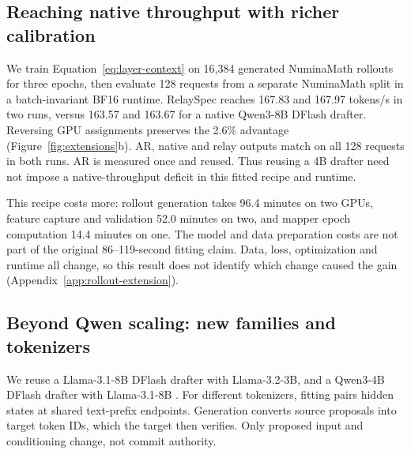 \documentclass{article}
\begin{document}
\begin{table}[H]
\caption{Public-runtime comparison on 128 MATH development questions,
2,048-token cap. Correct counts are out of 128, with each system's AR in
parentheses. Precision, attention and libraries differ, so speedups use
own-runtime AR. Bold marks the highest observed throughput and own-runtime speedup.
Settings and paired quality uncertainty appear in
Appendix~\ref{app:externalbaselines}.}
\label{tab:public-comparison}
\centering\small

\end{table}

\subsection{Reaching native throughput with richer calibration}
\label{sec:rollout-extension}

We train
Equation~\ref{eq:layer-context} on 16,384 generated NuminaMath rollouts \citep{li2024numinamath}
for three epochs, then evaluate 128 requests from a separate NuminaMath
split in a batch-invariant BF16 runtime. RelaySpec reaches 167.83 and
167.97 tokens/s in two runs, versus 163.57 and 163.67 for a native
Qwen3-8B DFlash drafter. Reversing GPU assignments preserves the 2.6\%
advantage (Figure~\ref{fig:extensions}b). AR, native and relay outputs
match on all 128 requests in both runs. AR is measured once and reused.
Thus reusing a 4B drafter need not impose a native-throughput deficit
in this fitted recipe and runtime.



This recipe costs more: rollout generation takes 96.4 minutes on two
GPUs, feature capture and validation 52.0 minutes on two, and mapper
epoch computation 14.4 minutes on one. The model and data preparation costs are not part of the
original 86--119-second fitting claim. Data, loss, optimization and
runtime all change, so this result does not identify which change caused
the gain (Appendix~\ref{app:rollout-extension}).

\subsection{Beyond Qwen scaling: new families and tokenizers}
\label{sec:family-extension}

We reuse a Llama-3.1-8B DFlash drafter with Llama-3.2-3B, and a
Qwen3-4B DFlash drafter with Llama-3.1-8B
\citep{grattafiori2024llama3,meta2024llama32}. For different tokenizers,
fitting pairs hidden states at shared text-prefix endpoints. Generation
converts source proposals into target token IDs, which the target then
verifies. Only proposed input and conditioning change, not commit authority.
\end{document}
